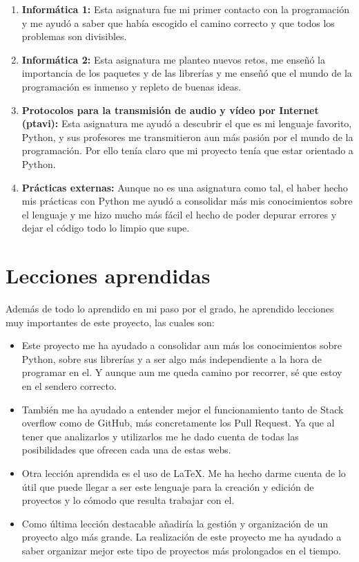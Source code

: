 \documentclass[a4paper, 12pt]{book}
\begin{document}
\begin{enumerate}
  \item \textbf{Informática 1:} Esta asignatura fue mi primer contacto con la programación y me ayudó a saber que había escogido el camino correcto y que todos los problemas son divisibles.
  \item \textbf{Informática 2:} Esta asignatura me planteo nuevos retos, me enseñó la importancia de los paquetes y de las librerías y me enseñó que el mundo de la programación es inmenso y repleto de buenas ideas.
  \item \textbf{Protocolos para la transmisión de audio y vídeo por Internet (ptavi):} Esta asignatura me ayudó a descubrir el que es mi lenguaje favorito, Python, y sus profesores me transmitieron aun más pasión por el mundo de la programación. Por ello tenía claro que mi proyecto tenía que estar orientado a Python.
  \item \textbf{Prácticas externas:} Aunque no es una asignatura como tal, el haber hecho mis prácticas con Python me ayudó a consolidar más mis conocimientos sobre el lenguaje y me hizo mucho más fácil el hecho de poder depurar errores y dejar el código todo lo limpio que supe.
\end{enumerate}


\section{Lecciones aprendidas}
\label{sec:lecciones_aprendidas}

Además de todo lo aprendido en mi paso por el grado, he aprendido lecciones muy importantes de este proyecto, las cuales son:

\begin{itemize}
	\item Este proyecto me ha ayudado a consolidar aun más los conocimientos sobre Python, sobre sus librerías y a ser algo más independiente a la hora de programar en el. Y aunque aun me queda camino por recorrer, sé que estoy en el sendero correcto.
	\item También me ha ayudado a entender mejor el funcionamiento tanto de Stack overflow como de GitHub, más concretamente los Pull Request. Ya que al tener que analizarlos y utilizarlos me he dado cuenta de todas las posibilidades que ofrecen cada una de estas webs.
	\item Otra lección aprendida es el uso de \LaTeX. Me ha hecho darme cuenta de lo útil que puede llegar a ser este lenguaje para la creación y edición de proyectos y lo cómodo que resulta trabajar con el.
	\item Como última lección destacable añadiría la gestión y organización de un proyecto algo más grande. La realización de este proyecto me ha ayudado a saber organizar mejor este tipo de proyectos más prolongados en el tiempo. 
\end{itemize}
\end{document}
